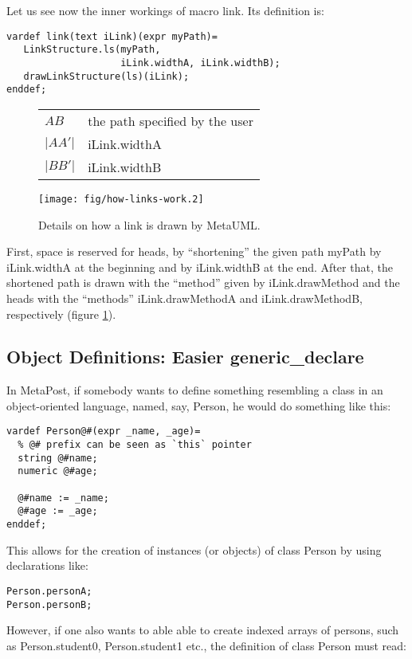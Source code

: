 \documentclass{article}
\newcommand{\code}{\ttfamily}
\newcommand{\metauml}{MetaUML}
\begin{document}
Let us see now the inner workings of macro {\code link}. Its definition is:

\begin{verbatim}
vardef link(text iLink)(expr myPath)=
   LinkStructure.ls(myPath,
                    iLink.widthA, iLink.widthB);
   drawLinkStructure(ls)(iLink);
enddef;
\end{verbatim}

\begin{figure}
\centering
\begin{tabular}{l|l}
$AB$ & the path specified by the user \\
$|AA'|$ & {\code iLink.widthA}\\
$|BB'|$ & {\code iLink.widthB}
\end{tabular}
\texttt{[image: fig/how-links-work.2]}
\caption{Details on how a link is drawn by \metauml.}
\label{fig:hlw2}
\end{figure}

First, space is reserved for heads, by ``shortening'' the given path {\code myPath}
by {\code iLink.widthA} at the beginning and by {\code iLink.widthB} at the end.
After that, the shortened path is drawn with the ``method''
given by {\code iLink.drawMethod} and the heads with the ``methods''
{\code iLink.drawMethodA} and {\code iLink.drawMethodB},
respectively (figure \ref{fig:hlw2}).

\subsection{Object Definitions: Easier {\code generic\_declare}}

In MetaPost, if somebody wants to define something resembling a class in an object-oriented language,
named, say, {\code Person}, he would do something like this:

\begin{verbatim}
vardef Person@#(expr _name, _age)=
  % @# prefix can be seen as `this` pointer
  string @#name;
  numeric @#age;

  @#name := _name;
  @#age := _age;
enddef;
\end{verbatim}

This allows for the creation of instances (or objects) of class {\code Person} by using
declarations like:

\begin{verbatim}
Person.personA;
Person.personB;
\end{verbatim}

 However, if one also wants to able able to create indexed arrays of persons, such as
{\code Person.student0}, {\code Person.student1} etc., the definition of class
{\code Person} must read:
\end{document}
